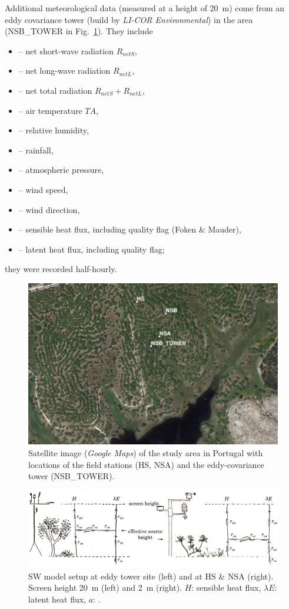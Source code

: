 \documentclass{scrreprt}
\newenvironment{denseitem}{
  \begin{itemize}
    \setlength{\itemsep}{0pt}
    \setlength{\parskip}{0pt}
    \setlength{\parsep}{0pt}
}{
  \end{itemize}
}
\begin{document}
Additional meteorological data (measured at a height of 20~m) come from an eddy covariance tower (build by \emph{LI-COR Environmental}) in the area (NSB\_TOWER in Fig.~\ref{fig:map_coruche}).
They include
\begin{denseitem}
  \item[--] net short-wave radiation $R_{netS}$,
  \item[--] net long-wave radiation $R_{netL}$,
  \item[--] net total radiation $R_{netS} + R_{netL}$,
  \item[--] air temperature $TA$,
  \item[--] relative humidity,
  \item[--] rainfall,
  \item[--] atmospheric pressure,
  \item[--] wind speed,
  \item[--] wind direction,
  \item[--] sensible heat flux, including quality flag (Foken \& Mauder),
  \item[--] latent heat flux, including quality flag;
\end{denseitem}
%
they were recorded half-hourly.

\begin{figure}[t]
  \centering
  \includegraphics[width=0.7\hsize]{./map_coruche}
  \caption{Satellite image (\emph{Google Maps}) of the study area in Portugal with locations of the field stations (HS, NSA) and the eddy-covariance tower (NSB\_TOWER).}
  \label{fig:map_coruche}
\end{figure}

\begin{figure}[t]
  \centering
  \includegraphics[width=1.0\hsize]{./sw_scheme}
  \caption{SW model setup at eddy tower site (left) and at HS \& NSA (right).
           Screen height 20~m (left) and 2~m (right).
           $H$: sensible heat flux, $\lambda E$: latent heat flux, $a$: .}
  \label{fig:sw_scheme}
\end{figure}
\end{document}
